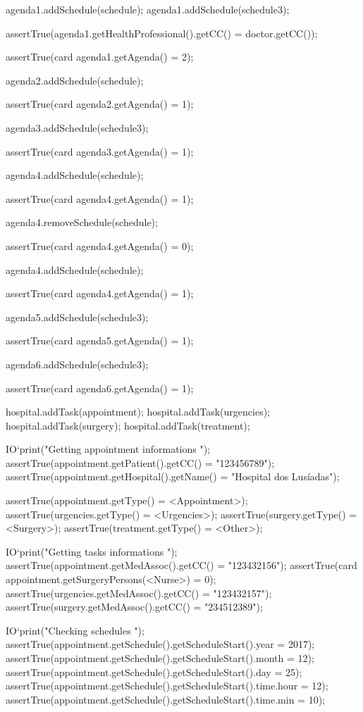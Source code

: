 \begin{vdmpp}[breaklines=true]
   agenda1.addSchedule(schedule);
   agenda1.addSchedule(schedule3);
   
   assertTrue(agenda1.getHealthProfessional().getCC() = doctor.getCC());
   
   assertTrue(card agenda1.getAgenda() = 2);
   
   agenda2.addSchedule(schedule);
   
   assertTrue(card agenda2.getAgenda() = 1);
  
   agenda3.addSchedule(schedule3);
   
   assertTrue(card agenda3.getAgenda() = 1);
   
   agenda4.addSchedule(schedule);
   
   assertTrue(card agenda4.getAgenda() = 1);
   
   agenda4.removeSchedule(schedule);
   
   assertTrue(card agenda4.getAgenda() = 0);
   
   agenda4.addSchedule(schedule);
   
   assertTrue(card agenda4.getAgenda() = 1);
   
   agenda5.addSchedule(schedule3);
   
   assertTrue(card agenda5.getAgenda() = 1);
   
   agenda6.addSchedule(schedule3);
   
   assertTrue(card agenda6.getAgenda() = 1);
   
   hospital.addTask(appointment);
   hospital.addTask(urgencies);
   hospital.addTask(surgery);
   hospital.addTask(treatment);
   
   IO`print("\n Getting appointment informations \n");
   assertTrue(appointment.getPatient().getCC() = "123456789");
   assertTrue(appointment.getHospital().getName() = "Hospital dos Lusíadas");
   
   assertTrue(appointment.getType() = <Appointment>);
   assertTrue(urgencies.getType() = <Urgencies>);
   assertTrue(surgery.getType() = <Surgery>);
   assertTrue(treatment.getType() = <Other>);
  
   IO`print("\n Getting tasks informations \n");
   assertTrue(appointment.getMedAssoc().getCC() = "123432156");
   assertTrue(card appointment.getSurgeryPersons(<Nurse>) = 0);
   assertTrue(urgencies.getMedAssoc().getCC() = "123432157");
   assertTrue(surgery.getMedAssoc().getCC() = "234512389");
   
   IO`print("\n Checking schedules \n");
   assertTrue(appointment.getSchedule().getScheduleStart().year = 2017);
   assertTrue(appointment.getSchedule().getScheduleStart().month = 12);
   assertTrue(appointment.getSchedule().getScheduleStart().day = 25);
   assertTrue(appointment.getSchedule().getScheduleStart().time.hour = 12);
   assertTrue(appointment.getSchedule().getScheduleStart().time.min = 10);
   

\end{vdmpp}

